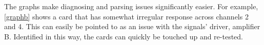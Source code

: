 The graphs make diagnosing and parsing issues significantly easier. For example, \ref{graphb} shows a card that has somewhat irregular response across channels 2 and 4. This can easily be pointed to as an issue with the signals' driver, amplifier B. Identified in this way, the cards can quickly be touched up and re-tested.